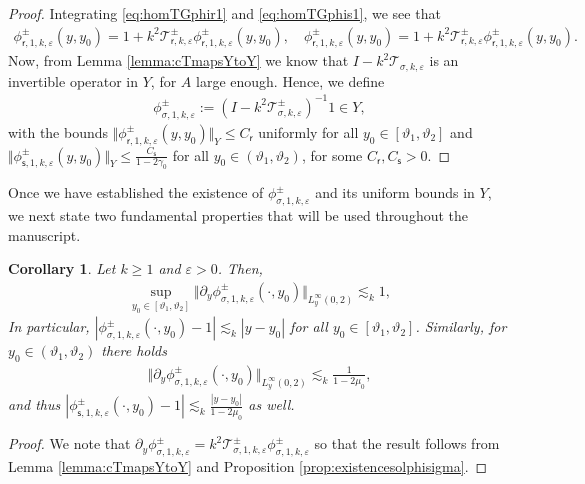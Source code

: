 \documentclass[11pt,reqno]{amsproc}
\newtheorem{corollary}[proposition]{Corollary}
\theoremstyle{definition}
\numberwithin{equation}{section}
\newcommand{\sr}{{\mathsf{r}}}
\newcommand{\s}{{\mathsf{s}}}
\newcommand{\cT}{{\mathcal T}}
\newcommand{\ep}{\varepsilon}
\begin{document}
\begin{proof}
Integrating \eqref{eq:homTGphir1} and \eqref{eq:homTGphis1}, we see that
\begin{align}\label{eq:fixedpointphisigma}
\phi_{\sr,1,k,\ep}^\pm (y,y_0) = 1 +k^2 \cT_{\sr,k,\ep}^\pm \phi_{\sr,1,k,\ep}^\pm (y,y_0), \quad \phi_{\sr,1,k,\ep}^\pm (y,y_0) = 1 + k^2 \cT_{\sr,k,\ep}^\pm \phi_{\sr,1,k,\ep}^\pm (y,y_0).
\end{align}
Now, from Lemma \ref{lemma:cTmapsYtoY} we know that $I-k^2\cT_{\sigma,k,\ep}$ is an invertible operator in $Y$, for $A$ large enough. Hence, we define
\begin{align}\label{eq:geometricphisigma}
\phi_{\sigma,1,k,\ep}^\pm := (I- k^2 \cT_{\sigma,k,\ep}^\pm)^{-1} 1\in Y,
\end{align}
with the bounds $\Vert \phi_{\sr,1,k,\ep}^\pm (y,y_0) \Vert_Y \leq C_\sr$ uniformly for all $y_0\in[\vartheta_1,\vartheta_2]$ and $\Vert \phi_{\s,1,k,\ep}^\pm (y,y_0) \Vert_Y \leq \frac{C_\s}{1-2\gamma_0}$ for all $y_0\in(\vartheta_1,\vartheta_2)$, for some $C_\sr, C_\s>0$.
\end{proof}

Once we have established the existence of $\phi_{\sigma,1,k,\ep}^\pm$ and its uniform bounds in $Y$, we next state two fundamental properties that will be used throughout the manuscript.

\begin{corollary}
Let $k\geq 1$ and $\ep>0$. Then,
\begin{align*}
\sup_{y_0\in [\vartheta_1,\vartheta_2]} \Vert  \partial_y \phi_{\sigma,1,k,\ep}^\pm(\cdot,y_0) \Vert_{L^\infty_y(0,2)} \lesssim_k 1,
\end{align*}
In particular, $\left| \phi_{\sigma,1,k,\ep}^\pm(\cdot,y_0) - 1 \right| \lesssim_k {|y-y_0|}$ for all $y_0\in[\vartheta_1, \vartheta_2]$. Similarly, for $y_0\in (\vartheta_1,\vartheta_2)$ there holds
\begin{align*}
 \Vert  \partial_y \phi_{\sigma,1,k,\ep}^\pm(\cdot,y_0) \Vert_{L^\infty_y(0,2)} \lesssim_k \frac{1}{1-2\mu_0},
\end{align*}
and thus $\left| \phi_{\s,1,k,\ep}^\pm(\cdot,y_0) - 1 \right| \lesssim_k \frac{|y-y_0|}{1-2\mu_0}$ as well.
\end{corollary}

\begin{proof}
We note that $\partial_y \phi_{\sigma,1,k,\ep}^\pm = k^2\cT_{\sigma,1,k,\ep}^\pm \phi_{\sigma,1,k,\ep}^\pm$ so that the result follows from Lemma \ref{lemma:cTmapsYtoY} and Proposition \ref{prop:existencesolphisigma}. 
\end{proof}
\end{document}
